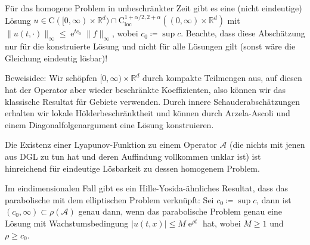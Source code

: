 \documentclass[11pt,a4paper]{scrartcl}
\newcommand{\R}{\mathbb{R}} %
\newcommand{\A}{\mathcal{A}}
\theoremstyle{plain}
\theoremstyle{definition}
\theoremstyle{remark}
\DeclareMathOperator{\e}{e}
\begin{document}
Für das homogene Problem in unbeschränkter Zeit gibt es eine (nicht eindeutige) Lösung $u\in \mathrm{C}([0,\infty)\times \R^d)\cap \mathrm{C}_\mathrm{loc}^{1+\alpha/2,2+\alpha}((0,\infty)\times \R^d)$ mit $\|u(t,\cdot)\|_\infty \leq \e^{tc_0}\|f\|_\infty$, wobei $c_0\coloneqq \sup c$. Beachte, dass diese Abschätzung nur für die konstruierte Lösung und nicht für alle Lösungen gilt (sonst wäre die Gleichung eindeutig lösbar)!

Beweisidee: Wir schöpfen $[0,\infty)\times \R^d$ durch kompakte Teilmengen aus, auf diesen hat der Operator aber wieder beschränkte Koeffizienten, also können wir das klassische Resultat für Gebiete verwenden. Durch innere Schauderabschätzungen erhalten wir lokale Hölderbeschränktheit und können durch Arzela-Ascoli und einem Diagonalfolgenargument eine Lösung konstruieren.

Die Existenz einer Lyapunov-Funktion zu einem Operator $\A$ (die nichts mit jenen aus DGL zu tun hat und deren Auffindung vollkommen unklar ist) ist hinreichend für eindeutige Lösbarkeit zu dessen homogenem Problem.

Im eindimensionalen Fall gibt es ein Hille-Yosida-ähnliches Resultat, dass das parabolische mit dem elliptischen Problem verknüpft: Sei $c_0\coloneqq \sup c$, dann ist $(c_0,\infty)\subset \rho(\A)$ genau dann, wenn das parabolische Problem genau eine Lösung mit Wachstumsbedingung $|u(t,x)|\leq M \e^{\rho t}$ hat, wobei $M\geq 1$ und $\rho \geq c_0$.
\end{document}
